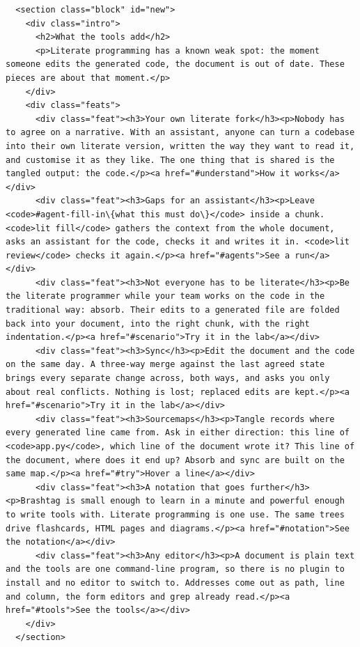 \documentclass[10pt,a4paper]{article}
\newcounter{chunk}
\begin{document}
\begin{Verbatim}
  <section class="block" id="new">
    <div class="intro">
      <h2>What the tools add</h2>
      <p>Literate programming has a known weak spot: the moment someone edits the generated code, the document is out of date. These pieces are about that moment.</p>
    </div>
    <div class="feats">
      <div class="feat"><h3>Your own literate fork</h3><p>Nobody has to agree on a narrative. With an assistant, anyone can turn a codebase into their own literate version, written the way they want to read it, and customise it as they like. The one thing that is shared is the tangled output: the code.</p><a href="#understand">How it works</a></div>
      <div class="feat"><h3>Gaps for an assistant</h3><p>Leave <code>#agent-fill-in\{what this must do\}</code> inside a chunk. <code>lit fill</code> gathers the context from the whole document, asks an assistant for the code, checks it and writes it in. <code>lit review</code> checks it again.</p><a href="#agents">See a run</a></div>
      <div class="feat"><h3>Not everyone has to be literate</h3><p>Be the literate programmer while your team works on the code in the traditional way: absorb. Their edits to a generated file are folded back into your document, into the right chunk, with the right indentation.</p><a href="#scenario">Try it in the lab</a></div>
      <div class="feat"><h3>Sync</h3><p>Edit the document and the code on the same day. A three-way merge against the last agreed state brings every separate change across, both ways, and asks you only about real conflicts. Nothing is lost; replaced edits are kept.</p><a href="#scenario">Try it in the lab</a></div>
      <div class="feat"><h3>Sourcemaps</h3><p>Tangle records where every generated line came from. Ask in either direction: this line of <code>app.py</code>, which line of the document wrote it? This line of the document, where does it end up? Absorb and sync are built on the same map.</p><a href="#try">Hover a line</a></div>
      <div class="feat"><h3>A notation that goes further</h3><p>Brashtag is small enough to learn in a minute and powerful enough to write tools with. Literate programming is one use. The same trees drive flashcards, HTML pages and diagrams.</p><a href="#notation">See the notation</a></div>
      <div class="feat"><h3>Any editor</h3><p>A document is plain text and the tools are one command-line program, so there is no plugin to install and no editor to switch to. Addresses come out as path, line and column, the form editors and grep already read.</p><a href="#tools">See the tools</a></div>
    </div>
  </section>


\end{Verbatim}
\end{document}
